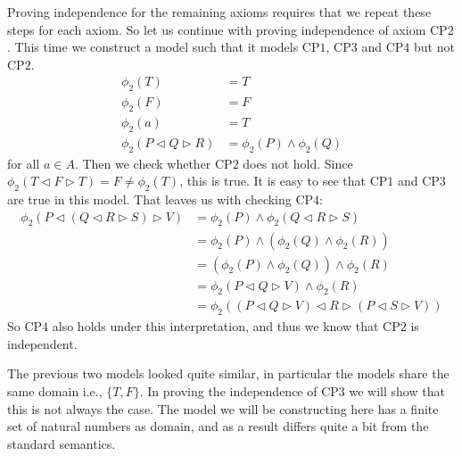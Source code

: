 \documentclass[a4paper,twoside,openright]{report}
\newcommand{\CP}[1]{\ensuremath{\mathrm{CP#1}}}
\newcommand{\lef}{\ensuremath{\triangleleft}}
\newcommand{\rig}{\ensuremath{\triangleright}}
\begin{document}
Proving independence for the remaining axioms requires that we repeat these steps for each axiom. So let us continue with proving independence of axiom \CP2. This time we construct a model such that it models \CP1, \CP3 and \CP4 but not \CP2.
\begin{align*}
\phi_2(T) &= T\\
\phi_2(F) &= F\\
\phi_2(a) &= T\\
\phi_2(P\lef Q\rig R) &= \phi_2(P)\wedge\phi_2(Q)
\end{align*}
for all $a\in A$. Then we check whether \CP2 does not hold. Since $\phi_2(T\lef F\rig T)=F\ne \phi_2(T)$, this is true. It is easy to see that \CP1 and \CP3 are true in this model. That leaves us with checking \CP4:
\begin{align*}
\phi_2(P\lef(Q\lef R\rig S)\rig V)
&=\phi_2(P)\wedge\phi_2(Q\lef R\rig S)\\
&=\phi_2(P)\wedge(\phi_2(Q)\wedge\phi_2(R))\\
&=(\phi_2(P)\wedge\phi_2(Q))\wedge\phi_2(R)\\
&=\phi_2(P\lef Q\rig V)\wedge\phi_2(R)\\
&=\phi_2((P\lef Q\rig V)\lef R\rig(P\lef S\rig V))
\end{align*}
So \CP4 also holds under this interpretation, and thus we know that \CP2 is independent.

The previous two models looked quite similar, in particular the models share the same domain i.e., $\{T,F\}$. In proving the independence of \CP3 we will show that this is not always the case. The model we will be constructing here has a finite set of natural numbers as domain, and as a result differs quite a bit from the standard semantics.
\end{document}
